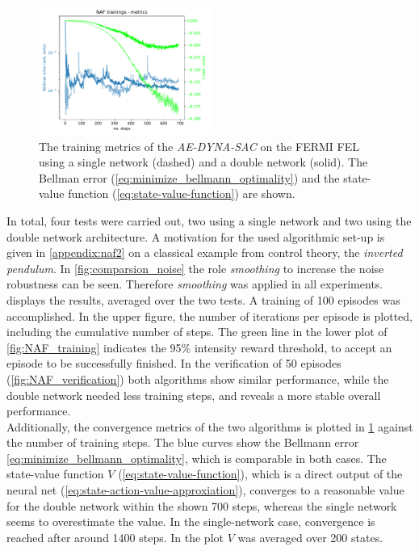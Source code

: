 \documentclass[
reprint,
amsmath,amssymb,amsfonts,clevref,
aps,
prstab,
]{revtex4-2}
\begin{document}
	\begin{figure}
		\centering
		\includegraphics*[width=0.5\textwidth]{Figures/FERMI_all_experiments_NAF_convergence.pdf}
		\caption{The training metrics of the \emph{AE-DYNA-SAC} on the FERMI FEL using a single network (dashed) and a double network (solid). The Bellman error (\cref{eq:minimize_bellmann_optimality}) and the state-value function (\cref{eq:state-value-function}) are shown. }
		\label{fig:NAF_convergence}
	\end{figure}
	In total, four tests were carried out, two using a single network and two using the double network architecture. A motivation for the used algorithmic set-up is given in \cref{appendix:naf2} on a classical example from control theory, the \emph{inverted pendulum}. In \cref{fig:comparsion_noise} the role \emph{smoothing} to increase the noise robustness can be seen. Therefore \emph{smoothing} was applied in all experiments.\\
	 displays the results, averaged over the two tests. A training of 100 episodes was accomplished. In the upper figure, the number of iterations per episode is plotted, including the cumulative number of steps. The green line in the lower plot of \cref{fig:NAF_training} indicates the 95\% intensity reward threshold, to accept an episode to be successfully finished.
	In the verification of 50 episodes (\cref{fig:NAF_verification}) both algorithms show similar performance, while the double network needed less training steps, and reveals a more stable overall performance. \\
	Additionally, the convergence metrics of the two algorithms is plotted in \cref{fig:NAF_convergence} against the number of training steps. The blue curves show the Bellmann error \cref{eq:minimize_bellmann_optimality}, which is comparable in both cases. The state-value function $V$ (\cref{eq:state-value-function}), which is a direct output of the neural net (\cref{eq:state-action-value-approxiation}), converges to a reasonable value for the double network within the shown 700 steps, whereas the single network seems to overestimate the value. In the single-network case, convergence is reached after around 1400 steps. In the plot $V$ was averaged over 200 states.
\end{document}
